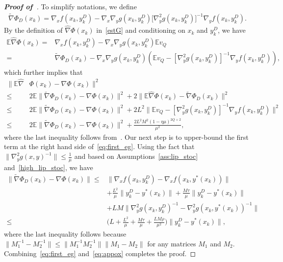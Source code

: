 \documentclass{osudissert96}
\begin{document}
\begin{proof}[\bf Proof of~] To simplify notations, we define 
\begin{align}\label{def:phih}
\widetilde \nabla \Phi_D(x_k) =  \nabla_x f(x_k,y^D_k) -\nabla_x \nabla_y g(x_k,y^D_k) \big[\nabla_y^2 g(x_k,y^D_k)\big]^{-1}
\nabla_y f(x_k,y^D_k).
\end{align}
By the definition of $\widehat \nabla \Phi(x_k)$ in~\cref{estG} and conditioning on $x_k$ and $y_k^D$, we have 
\begin{align*}
\mathbb{E}\widehat \nabla \Phi(x_k) =&  \nabla_x f(x_k,y_k^D)-\nabla_x \nabla_y g(x_k,y_k^D)\mathbb{E} v_Q\nonumber
\\=&\widetilde \nabla \Phi_D(x_k) - \nabla_x \nabla_y g(x_k,y_k^D)( \mathbb{E}v_Q- [\nabla_y^2 g(x_k,y^D_k)]^{-1}\nabla_y f(x_k,y_k^D)),
\end{align*}
which further implies that 
\begin{align}\label{eq:first_eg}
\big\|\mathbb{E}\widehat \nabla& \Phi(x_k)- \nabla \Phi(x_k)  \big\|^2\nonumber
\\\leq &2\mathbb{E}\|\widetilde \nabla \Phi_D(x_k) -\nabla \Phi(x_k)\|^2 +  2\|\mathbb{E}\widehat \nabla \Phi(x_k)- \widetilde \nabla \Phi_D(x_k)\|^2 \nonumber
\\\leq&2\mathbb{E}\|\widetilde \nabla \Phi_D(x_k) -\nabla \Phi(x_k)\|^2 + 2L^2\| \mathbb{E}v_Q- [\nabla_y^2 g(x_k,y^D_k)]^{-1}\nabla_y f(x_k,y_k^D) \|^2\nonumber
\\\leq& 2\mathbb{E}\|\widetilde \nabla \Phi_D(x_k) -\nabla \Phi(x_k)\|^2  + \frac{ 2L^2M^2(1-\eta\mu)^{2Q+2}}{\mu^2},
\end{align}
where the last inequality follows from~.  
Our next step is to upper-bound the first term at the right hand side of~\cref{eq:first_eg}. Using the fact that $\big\|\nabla_y^2 g(x,y)^{-1}\big\|\leq \frac{1}{\mu}$ and based on Assumptions~\ref{ass:lip_stoc} and~\ref{high_lip_stoc}, we have
\begin{align}\label{eq:appox}
\|\widetilde \nabla \Phi_D(x_k) -\nabla \Phi(x_k)\| \leq &\| \nabla_x f(x_k,y^D_k)- \nabla_x f(x_k,y^*(x_k))\| \nonumber
\\&+\frac{L^2}{\mu}\|y_k^D-y^*(x_k)\|+ \frac{M\tau}{\mu}\|y_k^D-y^*(x_k)\| \nonumber
\\&+ LM \big\|\nabla_y^2 g(x_k,y^D_k)^{-1} \nonumber
-\nabla_y^2 g(x_k,y^*(x_k))^{-1}
\big\|
\\\leq & \Big( L+\frac{L^2}{\mu} + \frac{M\tau}{\mu}+\frac{LM\rho}{\mu^2}\Big) \|y_k^D-y^*(x_k)\|,
\end{align} 
where  the last inequality follows because $\|M_1^{-1}-M_2^{-1}\|\leq \|M_1^{-1}M_2^{-1}\|\|M_1-M_2\| $ for any  matrices $M_1$ and $M_2$. Combining~\cref{eq:first_eg} and~\cref{eq:appox}
 completes the proof.
\end{proof}
\end{document}
